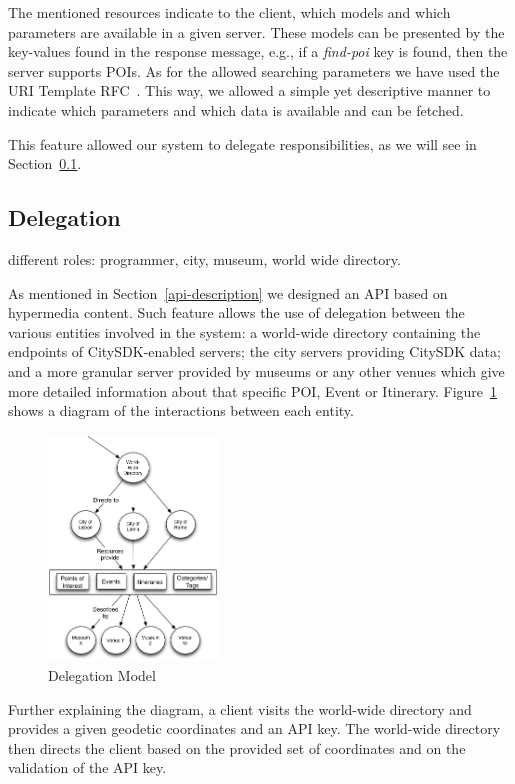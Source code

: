 \documentclass[times]{ettauth}
\begin{document}
The mentioned resources indicate to the client, which models and which parameters are available in a given server. These models can be presented by the key-values found in the response message, e.g., if a \textit{find-poi} key is found, then the server supports \acp{POI}. As for the allowed searching parameters we have used the URI Template RFC~\cite{uri-template}. This way, we allowed a simple yet descriptive manner to indicate which parameters and which data is available and can be fetched.

This feature allowed our system to delegate responsibilities, as we will see in Section~\ref{delegation}.

\subsection{Delegation}
\label{delegation}

different roles: programmer, city, museum, world wide directory.


As mentioned in Section~\ref{api-description} we designed an API based on hypermedia content. Such feature allows the use of delegation between the various entities involved in the system: a world-wide directory containing the endpoints of CitySDK-enabled servers; the city servers providing CitySDK data; and a more granular server provided by museums or any other venues which give more detailed information about that specific \ac{POI}, Event or Itinerary. Figure~\ref{fig:delegation} shows a diagram of the interactions between each entity.

\begin{figure}[!ht]
\centering
\includegraphics[width=0.4\textwidth]{images/delegation}
\caption{Delegation Model}
\label{fig:delegation}
\end{figure}

Further explaining the diagram, a client visits the world-wide directory and provides a given geodetic coordinates and an API key. The world-wide directory then directs the client based on the provided set of  coordinates and on the validation of the API key.
\end{document}
